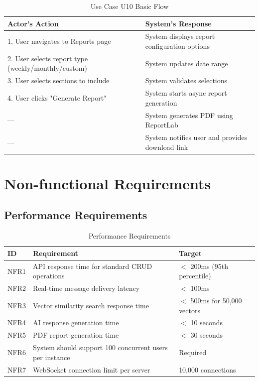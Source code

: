 \documentclass[11pt,a4paper]{article}
\begin{document}
\begin{table}[H]
\centering
\begin{tabular}{p{6cm}p{7cm}}
\toprule
\textbf{Actor's Action} & \textbf{System's Response} \\
\midrule
1. User navigates to Reports page & System displays report configuration options \\
2. User selects report type (weekly/monthly/custom) & System updates date range \\
3. User selects sections to include & System validates selections \\
4. User clicks "Generate Report" & System starts async report generation \\
--- & System generates PDF using ReportLab \\
--- & System notifies user and provides download link \\
\bottomrule
\end{tabular}
\caption{Use Case U10 Basic Flow}
\end{table}

\section{Non-functional Requirements}

\subsection{Performance Requirements}

\begin{table}[H]
\centering
\begin{tabular}{p{1.5cm}p{8cm}p{3.5cm}}
\toprule
\textbf{ID} & \textbf{Requirement} & \textbf{Target} \\
\midrule
NFR1 & API response time for standard CRUD operations & $<$ 200ms (95th percentile) \\
NFR2 & Real-time message delivery latency & $<$ 100ms \\
NFR3 & Vector similarity search response time & $<$ 500ms for 50,000 vectors \\
NFR4 & AI response generation time & $<$ 10 seconds \\
NFR5 & PDF report generation time & $<$ 30 seconds \\
NFR6 & System should support 100 concurrent users per instance & Required \\
NFR7 & WebSocket connection limit per server & 10,000 connections \\
\bottomrule
\end{tabular}
\caption{Performance Requirements}
\end{table}
\end{document}

